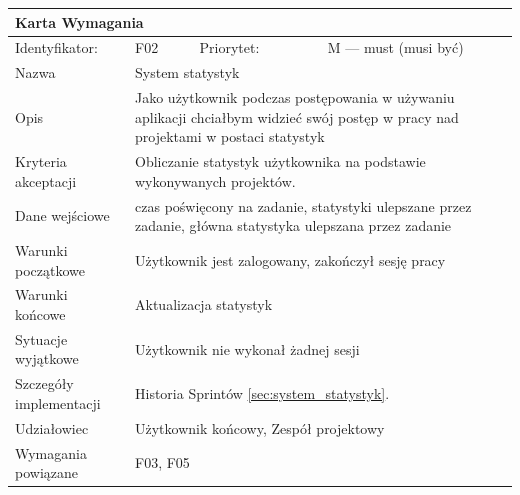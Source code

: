 \documentclass[a4paper,11pt]{report}
\begin{document}
		\begin{tabular}{|p{3cm}|p{2cm}|p{2cm}|p{6cm}|}
		\hline
		\multicolumn{4}{|p{12 cm}|}{Karta Wymagania}\\
		\hline
		Identyfikator: & F02 & Priorytet: & M — must (musi być)\\
		\hline
		Nazwa & \multicolumn{3}{|p{10 cm}|}{System statystyk}\\
		\hline
		Opis & \multicolumn{3}{|p{10 cm}|}{Jako użytkownik podczas postępowania w używaniu aplikacji chciałbym widzieć swój postęp w pracy nad projektami w postaci statystyk}\\
		\hline
		Kryteria akceptacji & \multicolumn{3}{|p{10 cm}|}{Obliczanie statystyk użytkownika na podstawie wykonywanych projektów.}\\
		\hline
		Dane wejściowe & \multicolumn{3}{|p{10 cm}|}{czas poświęcony na zadanie, statystyki ulepszane przez zadanie, główna statystyka ulepszana przez zadanie}\\
		\hline
		Warunki początkowe & \multicolumn{3}{|p{10 cm}|}{Użytkownik jest zalogowany, zakończył sesję pracy}\\
		\hline
		Warunki końcowe & \multicolumn{3}{|p{10 cm}|}{Aktualizacja statystyk}\\
		\hline
		Sytuacje wyjątkowe & \multicolumn{3}{|p{10 cm}|}{Użytkownik nie wykonał żadnej sesji}\\
		\hline
		Szczegóły implementacji & \multicolumn{3}{|p{10 cm}|}{Historia Sprintów \ref{sec:system_statystyk}.}\\
		\hline
		Udziałowiec & \multicolumn{3}{|p{10 cm}|}{Użytkownik końcowy, Zespół projektowy}\\
		\hline
		Wymagania powiązane & \multicolumn{3}{|p{10 cm}|}{F03, F05}\\
		\hline
		\end{tabular}
		\newline
		\vspace*{0,2 cm}
		\newline
\end{document}
